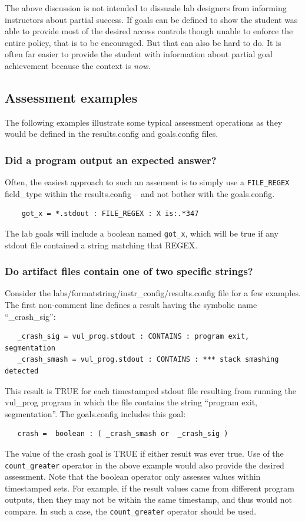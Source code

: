 \documentclass[12pt]{article}
\begin{document}
The above discussion is not intended to dissuade lab designers from informing instructors about partial success.  If goals
can be defined to show the student was able to provide most of the desired access controls though unable to enforce the entire policy, 
that is to be encouraged.  But that can also be hard to do.  It is often far easier to provide the student with information about partial
goal achievement because the context is \textit{now}.

\subsection{Assessment examples}
\label{examples}
The following examples illustrate some typical assessment operations as they would
be defined in the results.config and goals.config files.

\subsubsection{Did a program output an expected answer?}
Often, the easiest approach to such an assement is to simply use a {\tt FILE\_REGEX} field\_type
within the results.config -- and not bother with the goals.config.
\begin{verbatim}
    got_x = *.stdout : FILE_REGEX : X is:.*347
\end{verbatim}
The lab goals will include a boolean named {\tt got\_x}, which will be true if any stdout file
contained a string matching that REGEX.

\subsubsection{Do artifact files contain one of two specific strings?}
Consider the labs/formatstring/instr\_config/results.config file for a few examples.  
The first non-comment line defines a result having the symbolic name ``\_crash\_sig'':
\begin{verbatim}
   _crash_sig = vul_prog.stdout : CONTAINS : program exit, segmentation
   _crash_smash = vul_prog.stdout : CONTAINS : *** stack smashing detected
\end{verbatim}
\noindent This result is TRUE for each timestamped stdout file resulting from running 
the vul\_prog program in which the file contains the string ``program exit, segmentation''.
The goals.config includes this goal:
\begin{verbatim}
   crash =  boolean : ( _crash_smash or  _crash_sig )
\end{verbatim}
\noindent The value of the crash goal is TRUE if either result was ever true.
Use of the {\tt count\_greater} operator in the above example would also provide
the desired assessment.  Note that the boolean operator only assesses values within
timestamped sets. For example, if the result values came from different program
outputs, then they may not be within the same timestamp, and thus would not compare.
In such a case, the {\tt count\_greater} operator should be used. 
\end{document}
